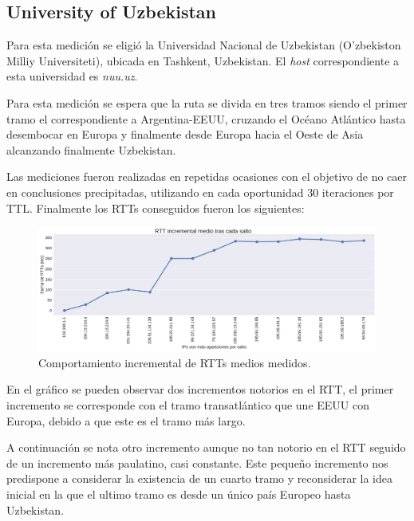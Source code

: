 \subsection{University of Uzbekistan}

Para esta medición se eligió la Universidad Nacional de Uzbekistan (O'zbekiston Milliy Universiteti), ubicada en Tashkent, Uzbekistan. El \emph{host} correspondiente a esta universidad es \emph{nuu.uz}.\par
Para esta medición se espera que la ruta se divida en tres tramos siendo el primer tramo el correspondiente a Argentina-EEUU, cruzando el Océano Atlántico hasta desembocar en Europa y finalmente desde Europa hacia el Oeste de Asia alcanzando finalmente Uzbekistan.\par
Las mediciones fueron realizadas en repetidas ocasiones con el objetivo de no caer en conclusiones precipitadas, utilizando en cada oportunidad 30 iteraciones por TTL. Finalmente los RTTs conseguidos fueron los siguientes: \\
\begin{figure}[H]
    \centering
    \includegraphics[width=1\textwidth, height=1\textheight, keepaspectratio]{../img/nuu-uz-incrementales}
    \caption{Comportamiento incremental de RTTs medios medidos.}
    \label{fig:nuu-uz-incrementales}
\end{figure}
En el gráfico se pueden observar dos incrementos notorios en el RTT, el primer incremento se corresponde con el tramo transatlántico que une EEUU con Europa, debido a que este es el tramo más largo.\par
A continuación se nota otro incremento aunque no tan notorio en el RTT seguido de un incremento más paulatino, casi constante. Este pequeño incremento nos predispone a considerar la existencia de un cuarto tramo y reconsiderar la idea inicial en la que el ultimo tramo es desde un único país Europeo hasta Uzbekistan.\par


